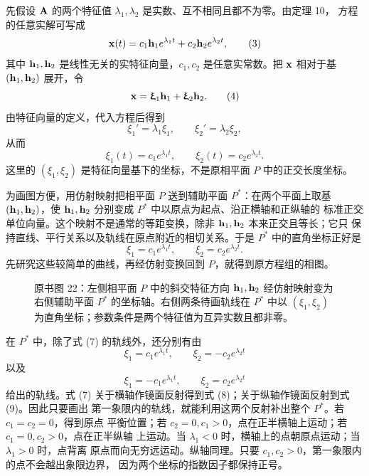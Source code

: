 先假设 \(\mathbf{A}\) 的两个特征值 \(\lambda_1,\lambda_2\) 是实数、互不相同且都不为零。由定理 10，
方程的任意实解可写成
\begin{equation}
 \vect{x}(t)=c_1\vect{h}_1e^{\lambda_1t}+c_2\vect{h}_2e^{\lambda_2t},
 \tag{3}
\end{equation}
其中 \(\vect{h}_1,\vect{h}_2\) 是线性无关的实特征向量，\(c_1,c_2\) 是任意实常数。把 \(\vect{x}\) 相对于基
\((\vect{h}_1,\vect{h}_2)\) 展开，令
\begin{equation}
 \vect{x}=\xi_1\vect{h}_1+\xi_2\vect{h}_2.
 \tag{4}
\end{equation}
由特征向量的定义，代入方程后得到
\begin{equation}
 \xi_1'=\lambda_1\xi_1,\qquad
 \xi_2'=\lambda_2\xi_2,
 \tag{5}
\end{equation}
从而
\begin{equation}
 \xi_1(t)=c_1e^{\lambda_1t},\qquad
 \xi_2(t)=c_2e^{\lambda_2t}.
 \tag{6}
\end{equation}
这里的 \((\xi_1,\xi_2)\) 是特征向量基下的坐标，不是原相平面 \(P\) 中的正交长度坐标。

为画图方便，用仿射映射把相平面 \(P\) 送到辅助平面 \(P^*\)：在两个平面上取基
\((\vect{h}_1,\vect{h}_2)\)，使 \(\vect{h}_1,\vect{h}_2\) 分别变成 \(P^*\) 中以原点为起点、沿正横轴和正纵轴的
标准正交单位向量。这个映射不是通常的等距变换，除非 \(\vect{h}_1,\vect{h}_2\) 本来正交且等长；它只
保持直线、平行关系以及轨线在原点附近的相切关系。于是 \(P^*\) 中的直角坐标正好是
\begin{equation}
 \xi_1=c_1e^{\lambda_1t},\qquad
 \xi_2=c_2e^{\lambda_2t}.
 \tag{7}
\end{equation}
先研究这些较简单的曲线，再经仿射变换回到 \(P\)，就得到原方程组的相图。

\begin{figure}[H]
 \centering
 
 \caption{原书图 22：左侧相平面 \(P\) 中的斜交特征方向 \(\vect{h}_1,\vect{h}_2\) 经仿射映射变为
 右侧辅助平面 \(P^*\) 的坐标轴。右侧两条待画轨线在 \(P^*\) 中以 \((\xi_1,\xi_2)\)
 为直角坐标；参数条件是两个特征值为互异实数且都非零。}
 \label{fig:ch2-p2-22}
\end{figure}

在 \(P^*\) 中，除了式 (7) 的轨线外，还分别有由
\begin{equation}
 \xi_1=c_1e^{\lambda_1t},\qquad
 \xi_2=-c_2e^{\lambda_2t}
 \tag{8}
\end{equation}
以及
\begin{equation}
 \xi_1=-c_1e^{\lambda_1t},\qquad
 \xi_2=c_2e^{\lambda_2t}
 \tag{9}
\end{equation}
给出的轨线。式 (7) 关于横轴作镜面反射得到式 (8)；关于纵轴作镜面反射到式 (9)。因此只要画出
第一象限内的轨线，就能利用这两个反射补出整个 \(P^*\)。若 \(c_1=c_2=0\)，得到原点
平衡位置；若 \(c_2=0,c_1>0\)，点在正半横轴上运动；若 \(c_1=0,c_2>0\)，点在正半纵轴
上运动。当 \(\lambda_1<0\) 时，横轴上的点朝原点运动；当 \(\lambda_1>0\) 时，点背离
原点而向无穷远运动。纵轴同理。只要 \(c_1,c_2>0\)，第一象限内的点不会越出象限边界，
因为两个坐标的指数因子都保持正号。

